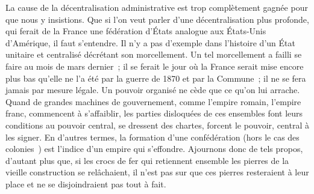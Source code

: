 \documentclass[french,twoside]{book} %
\begin{document}
La cause de la décentralisation administrative est trop complètement gagnée pour que nous y insistions. Que si l’on veut parler d’une décentralisation plus profonde, qui ferait de la France une fédération d’États analogue aux États-Unis d’Amérique, il faut s’entendre. Il n’y a pas d’exemple dans l’histoire d’un État unitaire et centralisé décrétant son morcellement. Un tel morcellement a failli se faire au mois de mars dernier ; il se ferait le jour où la France serait mise encore plus bas qu’elle ne l’a été par la guerre de 1870 et par la Commune ; il ne se fera jamais par mesure légale. Un pouvoir organisé ne cède que ce qu’on lui arrache. Quand de grandes machines de gouvernement, comme l’empire romain, l’empire franc, commencent à s’affaiblir, les parties disloquées de ces ensembles font leurs conditions au pouvoir central, se dressent des chartes, forcent le pouvoir, central à les signer. En d’autres termes, la formation d’une confédération (hors le cas des colonies ) est l’indice d’un empire qui s’effondre. Ajournons donc de tels propos, d’autant plus que, si les crocs de fer qui retiennent ensemble les pierres de la vieille construction se relâchaient, il n’est pas sur que ces pierres resteraient à leur place et ne se disjoindraient pas tout à fait.\par
\end{document}
